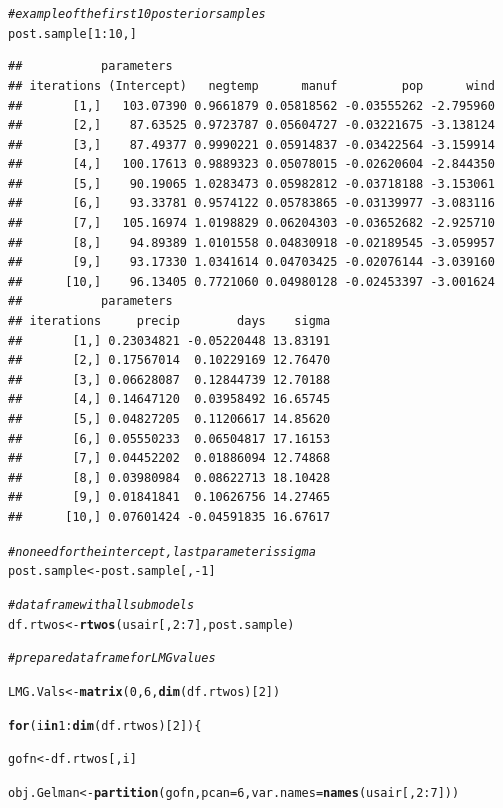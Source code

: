 \documentclass[11pt,a4paper,twoside]{book}\usepackage[]{graphicx}\usepackage[]{color}
\makeatletter
\newcommand{\hlnum}[1]{\textcolor[rgb]{0.686,0.059,0.569}{#1}}%
\newcommand{\hlcom}[1]{\textcolor[rgb]{0.678,0.584,0.686}{\textit{#1}}}%
\newcommand{\hlopt}[1]{\textcolor[rgb]{0,0,0}{#1}}%
\newcommand{\hlstd}[1]{\textcolor[rgb]{0.345,0.345,0.345}{#1}}%
\newcommand{\hlkwa}[1]{\textcolor[rgb]{0.161,0.373,0.58}{\textbf{#1}}}%
\newcommand{\hlkwb}[1]{\textcolor[rgb]{0.69,0.353,0.396}{#1}}%
\newcommand{\hlkwc}[1]{\textcolor[rgb]{0.333,0.667,0.333}{#1}}%
\newcommand{\hlkwd}[1]{\textcolor[rgb]{0.737,0.353,0.396}{\textbf{#1}}}%
\newenvironment{kframe}{%
 \def\at@end@of@kframe{}%
 \ifinner\ifhmode%
  \def\at@end@of@kframe{\end{minipage}}%
  \begin{minipage}{\columnwidth}%
 \fi\fi%
 \def\FrameCommand##1{\hskip\@totalleftmargin \hskip-\fboxsep
 \colorbox{shadecolor}{##1}\hskip-\fboxsep
     \hskip-\linewidth \hskip-\@totalleftmargin \hskip\columnwidth}%
 \MakeFramed {\advance\hsize-\width
   \@totalleftmargin\z@ \linewidth\hsize
   \@setminipage}}%
 {\par\unskip\endMakeFramed%
 \at@end@of@kframe}
\newenvironment{knitrout}{}{} %
\makeatother
\begin{document}
\begin{knitrout}
\begin{kframe}
\begin{alltt}
\hlcom{#example of the first 10 posterior samples}
\hlstd{post.sample[}\hlnum{1}\hlopt{:}\hlnum{10}\hlstd{,]}
\end{alltt}
\begin{verbatim}
##           parameters
## iterations (Intercept)   negtemp      manuf         pop      wind
##       [1,]   103.07390 0.9661879 0.05818562 -0.03555262 -2.795960
##       [2,]    87.63525 0.9723787 0.05604727 -0.03221675 -3.138124
##       [3,]    87.49377 0.9990221 0.05914837 -0.03422564 -3.159914
##       [4,]   100.17613 0.9889323 0.05078015 -0.02620604 -2.844350
##       [5,]    90.19065 1.0283473 0.05982812 -0.03718188 -3.153061
##       [6,]    93.33781 0.9574122 0.05783865 -0.03139977 -3.083116
##       [7,]   105.16974 1.0198829 0.06204303 -0.03652682 -2.925710
##       [8,]    94.89389 1.0101558 0.04830918 -0.02189545 -3.059957
##       [9,]    93.17330 1.0341614 0.04703425 -0.02076144 -3.039160
##      [10,]    96.13405 0.7721060 0.04980128 -0.02453397 -3.001624
##           parameters
## iterations     precip        days    sigma
##       [1,] 0.23034821 -0.05220448 13.83191
##       [2,] 0.17567014  0.10229169 12.76470
##       [3,] 0.06628087  0.12844739 12.70188
##       [4,] 0.14647120  0.03958492 16.65745
##       [5,] 0.04827205  0.11206617 14.85620
##       [6,] 0.05550233  0.06504817 17.16153
##       [7,] 0.04452202  0.01886094 12.74868
##       [8,] 0.03980984  0.08622713 18.10428
##       [9,] 0.01841841  0.10626756 14.27465
##      [10,] 0.07601424 -0.04591835 16.67617
\end{verbatim}
\begin{alltt}
\hlcom{#no need for the intercept, last parameter is sigma}
\hlstd{post.sample} \hlkwb{<-} \hlstd{post.sample[,}\hlopt{-}\hlnum{1}\hlstd{]}

\hlcom{#data frame with all submodels}
\hlstd{df.rtwos} \hlkwb{<-}\hlkwd{rtwos}\hlstd{(usair[,}\hlnum{2}\hlopt{:}\hlnum{7}\hlstd{], post.sample)}


\hlcom{# prepare data frame for LMG values}

\hlstd{LMG.Vals}\hlkwb{<-}\hlkwd{matrix}\hlstd{(}\hlnum{0}\hlstd{,} \hlnum{6}\hlstd{,} \hlkwd{dim}\hlstd{(df.rtwos)[}\hlnum{2}\hlstd{])}

\hlkwa{for}\hlstd{(i} \hlkwa{in} \hlnum{1}\hlopt{:}\hlkwd{dim}\hlstd{(df.rtwos)[}\hlnum{2}\hlstd{])\{}

  \hlstd{gofn}\hlkwb{<-}\hlstd{df.rtwos[,i]}

  \hlstd{obj.Gelman}\hlkwb{<-}\hlkwd{partition}\hlstd{(gofn,} \hlkwc{pcan} \hlstd{=} \hlnum{6}\hlstd{,} \hlkwc{var.names} \hlstd{=} \hlkwd{names}\hlstd{(usair[,}\hlnum{2}\hlopt{:}\hlnum{7}\hlstd{]))}


\end{alltt}
\end{kframe}
\end{knitrout}
\end{document}
